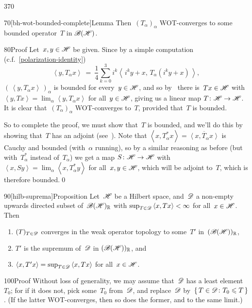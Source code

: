 \begin{parsec}{370}
\begin{point}{70}[bh-wot-bounded-complete]{Lemma}
Then~$(T_\alpha)_\alpha$
WOT-converges to some bounded operator~$T$ in $\mathscr{B}(\mathscr{H})$.
\begin{point}{80}{Proof}%
Let~$x,y\in \mathscr{H}$ be given.
Since by a simple computation
(c.f.~\eqref{polarization-identity})
\begin{equation*}
	\textstyle
	\left<y,T_\alpha x\right>
	\ = \ \frac{1}{4}\sum_{k=0}^3
	i^k\left<\,i^ky+x,\,T_\alpha (i^ky+x)\,\right>,
\end{equation*}
 $(\,\left<y,T_\alpha x\right>\,)_\alpha$
is bounded for every~$y\in \mathscr{H}$,
and so by~ there is~$Tx\in \mathscr{H}$ 
with $\left<y,Tx\right>=\lim_\alpha \left<y,T_\alpha x\right>$
for all~$y\in\mathscr{H}$,
giving us a linear map $T\colon \mathscr{H}\to \mathscr{H}$.
It is clear that~$(T_\alpha)_\alpha$
WOT-converges to~$T$,
provided that~$T$ is bounded.

So to complete the proof,
we must show that~$T$ is bounded,
and we'll do this by showing that~$T$ has an adjoint
(see~).
Note that $\left<x,T_\alpha^* x\right>=\overline{\left<x,T_\alpha x\right>}$
is Cauchy and bounded (with~$\alpha$ running),
so by a similar reasoning as before (but with~$T^*_\alpha$
instead of~$T_\alpha$)
we get a map
$S\colon \mathscr{H}\to\mathscr{H}$
with $\left<x,Sy\right>=\lim_\alpha \left<x,T^*_\alpha y\right>$
for all~$x,y\in\mathscr{H}$, which will be adjoint to~$T$,
which is therefore bounded.\qed
\end{point}
\end{point}
\begin{point}{90}[hilb-suprema]{Proposition}%
Let~$\mathscr{H}$ be a Hilbert space,
and~$\mathscr{D}$ a non-empty upwards directed subset of~$\mathscr{B}(\mathscr{H})_{\mathbb{R}}$
with $\sup_{T\in \mathscr{D}} \left<x,Tx\right> <\infty$
for all~$x\in \mathscr{H}$. Then
\begin{enumerate}
\item
$(T)_{T\in\mathscr{D}}$
converges 
in the weak operator topology
to some~$T'$ in~$(\mathscr{B}(\mathscr{H}))_{\mathbb{R}}$,
\item
$T'$ is the supremum of~$\mathscr{D}$
in $(\mathscr{B}(\mathscr{H}))_{\mathbb{R}}$,
and 
\item
$\left<x,T'x\right> = 
\sup_{T\in\mathscr{D}}\left<x,Tx\right> $
for all~$x\in \mathscr{H}$.
\end{enumerate}
\spacingfix
\begin{point}{100}{Proof}%
Without loss of generality,
we may assume that~$\mathscr{D}$ has a least element~$T_0$;
for if it does not,
pick some~$T_0$ from~$\mathscr{D}$,
and replace~$\mathscr{D}$ by~$\{\,T\in\mathscr{D}\colon T_0\leqslant T\,\}$.
(If the latter WOT-converges,
then so does the former,
and to the same limit.)


\end{point}
\end{point}
\end{parsec}
